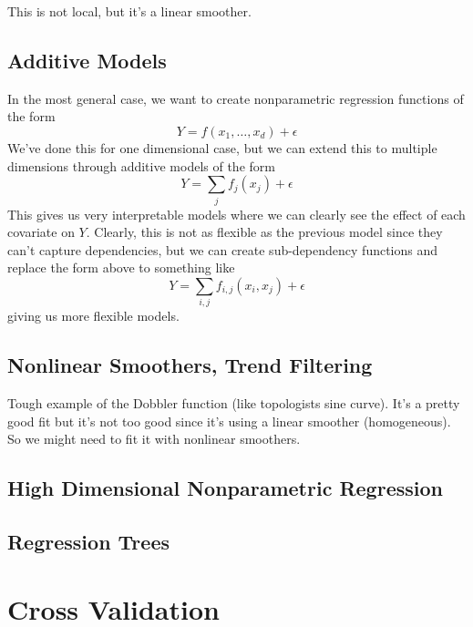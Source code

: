 \documentclass{article}
\begin{document}
    This is not local, but it's a linear smoother. 

  \subsection{Additive Models}

    In the most general case, we want to create nonparametric regression functions of the form 
    \begin{equation}
      Y = f(x_1, \ldots, x_d) + \epsilon 
    \end{equation}
    We've done this for one dimensional case, but we can extend this to multiple dimensions through additive models of the form 
    \begin{equation}
      Y = \sum_j f_j (x_j)  + \epsilon
    \end{equation}
    This gives us very interpretable models where we can clearly see the effect of each covariate on $Y$. Clearly, this is not as flexible as the previous model since they can't capture dependencies, but we can create sub-dependency functions and replace the form above to something like 
    \begin{equation}
      Y = \sum_{i, j} f_{i, j} (x_i, x_j) + \epsilon
    \end{equation}
    giving us more flexible models. 
  
  \subsection{Nonlinear Smoothers, Trend Filtering} 

    Tough example of the Dobbler function (like topologists sine curve). It's a pretty good fit but it's not too good since it's using a linear smoother (homogeneous). So we might need to fit it with nonlinear smoothers. 

  \subsection{High Dimensional Nonparametric Regression}

  \subsection{Regression Trees}

\section{Cross Validation} 
\end{document}
